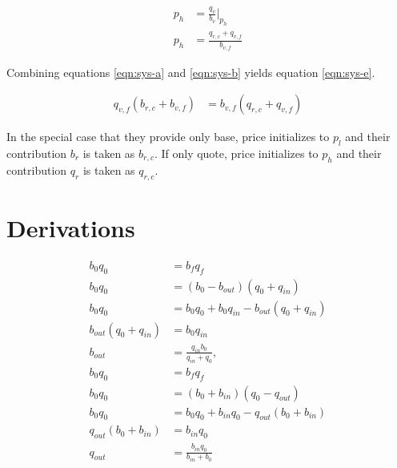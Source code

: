 \documentclass[table, twocolumn]{article}
\begin{document}
\begin{align} \label{eqn:sys-d}
  p_h &= \frac{q_v}{b_v}|_{p_h} \nonumber \\
  p_h &= \frac{q_{r, c} + q_{v, f}}{b_{v, f}}
\end{align}

Combining equations \ref{eqn:sys-a} and \ref{eqn:sys-b} yields equation \ref{eqn:sys-e}.

\begin{align} \label{eqn:sys-e}
  q_{v, f} (b_{r, c} + b_{v, f}) &= b_{v, f} (q_{r, c} + q_{v, f})
\end{align}

In the special case that they provide only base, price initializes to $p_l$ and their
contribution $b_r$ is taken as $b_{r, c}$. If only quote, price initializes to $p_h$ and
their contribution $q_r$ is taken as $q_{r, c}$.

\appendix

\section{Derivations}

\begin{align} \label{eqn:b-q-out-simple-derivation}
  b_0 q_0               & = b_f q_f \nonumber                                      \\
  b_0 q_0               & = (b_0 - b_{out})(q_0 + q_{in}) \nonumber                \\
  b_0 q_0               & = b_0 q_0 + b_0 q_{in} - b_{out}(q_0 + q_{in}) \nonumber \\
  b_{out}(q_0 + q_{in}) & = b_{0} q_{in} \nonumber                                 \\
  b_{out}               & = \frac{q_{in} b_0}{q_{in} + q_0}, \nonumber             \\
  b_0 q_0               & = b_f q_f \nonumber                                      \\
  b_0 q_0               & = (b_0 + b_{in})(q_0 - q_{out}) \nonumber                \\
  b_0 q_0               & = b_0 q_0 + b_{in} q_0 - q_{out}(b_0 + b_{in}) \nonumber \\
  q_{out}(b_0 + b_{in}) & = b_{in} q_0 \nonumber                                   \\
  q_{out}               & = \frac{b_{in} q_0}{b_{in} + b_0}
\end{align}
\end{document}
